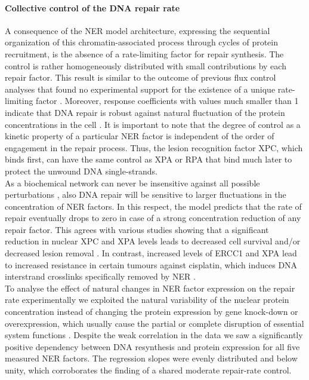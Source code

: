 \paragraph{Collective control of the DNA repair rate}
A consequence of the NER model architecture, expressing the sequential organization of this chromatin-associated process through cycles of protein recruitment, is the absence of a rate-limiting factor for repair synthesis. The control is rather homogeneously distributed with small contributions by each repair factor. This result is similar to the outcome of previous flux control analyses that found no experimental support for the existence of a unique rate-limiting factor \cite{Fell1992}. Moreover, response coefficients with values much smaller than 1 indicate that DNA repair is robust  against natural fluctuation of the protein concentrations in the cell \cite{Bluthgen2013}. It is important to note that the degree of control as a kinetic property of a particular NER factor is independent of the order of engagement in the repair process. Thus, the lesion recognition factor XPC, which binds first, can have the same control as XPA or RPA that bind much later to protect the unwound DNA single-strands.\\
As a biochemical network can never be insensitive against all possible perturbations \cite{Bluthgen2013,Csete2002}, also DNA repair will be sensitive to larger fluctuations in the concentration of NER factors. In this respect, the model predicts that the rate of repair eventually drops to zero in case of a strong concentration reduction of any repair factor. This agrees with various studies showing that a significant reduction in nuclear XPC and XPA levels leads to decreased cell survival and/or decreased lesion removal \cite{Koberle1999,Koberle2006,Renaud2011}. In contrast, increased levels of ERCC1 and XPA lead to increased resistance in certain tumours against cisplatin, which induces DNA interstrand crosslinks specifically removed by NER \cite{Koberle1999,Koberle2006,Renaud2011,Stewart2007,Arora2010}.   
\\ 
To analyse the effect of natural changes in NER factor expression on the repair rate experimentally we exploited the natural variability of the nuclear protein concentration instead of changing the protein expression by gene knock-down or overexpression, which usually cause the partial or complete disruption of essential system functions \cite{Moriya2006}. Despite the weak correlation in the data we saw a significantly positive dependency between DNA resynthesis and protein expression for all five measured NER factors. The regression slopes were evenly distributed and below unity, which corroborates the finding of a shared moderate repair-rate control.\\  
